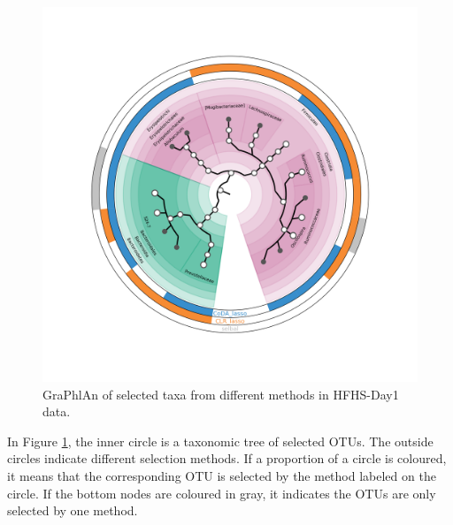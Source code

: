 \documentclass[openany]{book}
\begin{document}
\begin{figure}

{\centering \includegraphics[width=1\linewidth]{./graphlan/taxa} 

}

\caption{GraPhlAn of selected taxa from different methods in HFHS-Day1 data.}\label{fig:graphlanHFHS}
\end{figure}

In Figure \ref{fig:graphlanHFHS}, the inner circle is a taxonomic tree
of selected OTUs. The outside circles indicate different selection
methods. If a proportion of a circle is coloured, it means that the
corresponding OTU is selected by the method labeled on the circle. If
the bottom nodes are coloured in gray, it indicates the OTUs are only
selected by one method.


\end{document}
